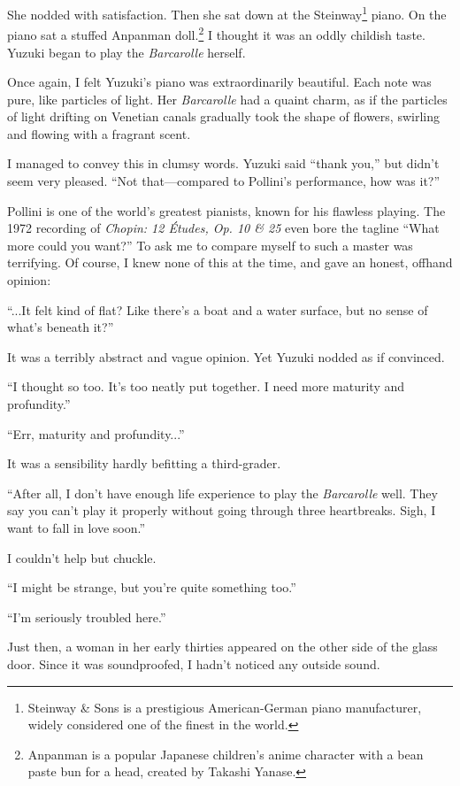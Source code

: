 \documentclass[
    a4paper,
    12pt,
    twoside,
    openany,
    UTF8,
    fontset=windows
]{ctexbook}
\begin{document}
She nodded with satisfaction. Then she sat down at the Steinway\footnote{Steinway \& Sons is a prestigious American-German piano manufacturer, widely considered one of the finest in the world.} piano. On the piano sat a stuffed Anpanman doll.\footnote{Anpanman is a popular Japanese children's anime character with a bean paste bun for a head, created by Takashi Yanase.} I thought it was an oddly childish taste. Yuzuki began to play the \textit{Barcarolle} herself.

Once again, I felt Yuzuki's piano was extraordinarily beautiful. Each note was pure, like particles of light. Her \textit{Barcarolle} had a quaint charm, as if the particles of light drifting on Venetian canals gradually took the shape of flowers, swirling and flowing with a fragrant scent.

I managed to convey this in clumsy words. Yuzuki said ``thank you,'' but didn't seem very pleased. ``Not that---compared to Pollini's performance, how was it?''

Pollini is one of the world's greatest pianists, known for his flawless playing. The 1972 recording of \textit{Chopin: 12 Études, Op. 10 \& 25} even bore the tagline ``What more could you want?'' To ask me to compare myself to such a master was terrifying. Of course, I knew none of this at the time, and gave an honest, offhand opinion:

``...It felt kind of flat? Like there's a boat and a water surface, but no sense of what's beneath it?''

It was a terribly abstract and vague opinion. Yet Yuzuki nodded as if convinced.

``I thought so too. It's too neatly put together. I need more maturity and profundity.''

``Err, maturity and profundity...''

It was a sensibility hardly befitting a third-grader.

``After all, I don't have enough life experience to play the \textit{Barcarolle} well. They say you can't play it properly without going through three heartbreaks. Sigh, I want to fall in love soon.''

I couldn't help but chuckle.

``I might be strange, but you're quite something too.''

``I'm seriously troubled here.''

Just then, a woman in her early thirties appeared on the other side of the glass door. Since it was soundproofed, I hadn't noticed any outside sound.
\end{document}
